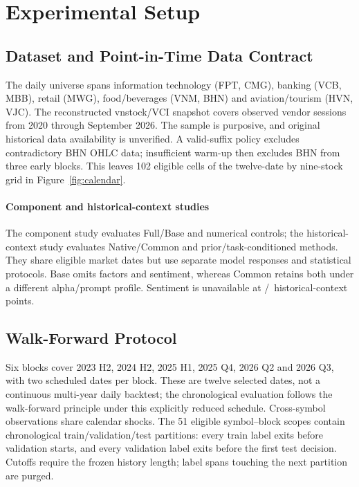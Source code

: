 \section{Experimental Setup}
\label{sec:experimentalsetup}

\subsection{Dataset and Point-in-Time Data Contract}
The daily universe spans information technology (FPT, CMG), banking (VCB, MBB), retail (MWG), food/beverages (VNM, BHN) and aviation/tourism (HVN, VJC). The reconstructed vnstock/VCI snapshot \cite{vnstock_docs} covers observed vendor sessions from 2020 through September 2026. The sample is purposive, and original historical data availability is unverified. A valid-suffix policy excludes contradictory BHN OHLC data; insufficient warm-up then excludes BHN from three early blocks. This leaves 102 eligible cells of the twelve-date by nine-stock grid in Figure~\ref{fig:calendar}.

\paragraph{Component and historical-context studies}
The component study evaluates Full/Base and numerical controls; the historical-context study evaluates Native/Common and prior/task-conditioned methods. They share eligible market dates but use separate model responses and statistical protocols. Base omits factors and sentiment, whereas Common retains both under a different alpha/prompt profile. Sentiment is unavailable at \UnifiedMissingSentiment/\UnifiedPoints\ historical-context points.

\subsection{Walk-Forward Protocol}
Six blocks cover 2023 H2, 2024 H2, 2025 H1, 2025 Q4, 2026 Q2 and 2026 Q3, with two scheduled dates per block. These are twelve selected dates, not a continuous multi-year daily backtest; the chronological evaluation follows the walk-forward principle \cite{pardo2008evaluation} under this explicitly reduced schedule. Cross-symbol observations share calendar shocks. The 51 eligible symbol--block scopes contain chronological train/validation/test partitions: every train label exits before validation starts, and every validation label exits before the first test decision. Cutoffs require the frozen history length; label spans touching the next partition are purged.


